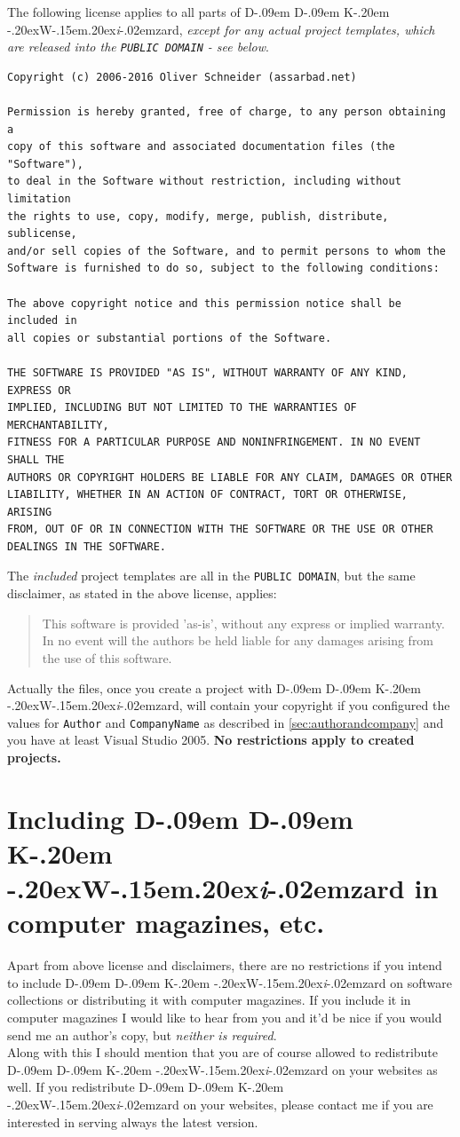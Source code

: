 \documentclass[a4paper,titlepage]{report}
\def\ddkwiz{D\kern-.09em D\kern-.09em K\kern-.20em \raise-.20ex\hbox{W}\kern-.15em\raise.20ex\hbox{\it{i}}\kern-.02em{zard}}
\begin{document}
The following license applies to all parts of \ddkwiz{}, \emph{except for any actual project templates, which are released into the \texttt{PUBLIC DOMAIN} - see below}.

\begin{verbatim}
Copyright (c) 2006-2016 Oliver Schneider (assarbad.net)

Permission is hereby granted, free of charge, to any person obtaining a
copy of this software and associated documentation files (the "Software"),
to deal in the Software without restriction, including without limitation
the rights to use, copy, modify, merge, publish, distribute, sublicense,
and/or sell copies of the Software, and to permit persons to whom the
Software is furnished to do so, subject to the following conditions:

The above copyright notice and this permission notice shall be included in
all copies or substantial portions of the Software.

THE SOFTWARE IS PROVIDED "AS IS", WITHOUT WARRANTY OF ANY KIND, EXPRESS OR
IMPLIED, INCLUDING BUT NOT LIMITED TO THE WARRANTIES OF MERCHANTABILITY,
FITNESS FOR A PARTICULAR PURPOSE AND NONINFRINGEMENT. IN NO EVENT SHALL THE
AUTHORS OR COPYRIGHT HOLDERS BE LIABLE FOR ANY CLAIM, DAMAGES OR OTHER
LIABILITY, WHETHER IN AN ACTION OF CONTRACT, TORT OR OTHERWISE, ARISING
FROM, OUT OF OR IN CONNECTION WITH THE SOFTWARE OR THE USE OR OTHER
DEALINGS IN THE SOFTWARE.
\end{verbatim}

The \emph{included} project templates are all in the \texttt{PUBLIC DOMAIN}, but the same
disclaimer, as stated in the above license, applies:

\begin{quote}
This software is provided 'as-is', without any express or implied warranty. In
no event will the authors be held liable for any damages arising from the use
of this software.
\end{quote}

Actually the files, once you create a project with \ddkwiz{}, will contain your
copyright if you configured the values for \texttt{Author} and \texttt{CompanyName}
as described in \autoref{sec:authorandcompany} and you have at least Visual
Studio 2005. \textbf{No restrictions apply to created projects.}

\section*{Including \ddkwiz{} in computer magazines, etc.}
\addcontentsline{toc}{section}{\numberline{}Redistributing \ddkwiz{}}
Apart from above license and disclaimers, there are no restrictions if you intend
to include \ddkwiz{} on software collections or distributing it with computer
magazines. If you include it in computer magazines I would like to hear from
you and it'd be nice if you would send me an author's copy, but \emph{neither is required}.\\
Along with this I should mention that you are of course allowed to redistribute
\ddkwiz{} on your websites as well. If you redistribute \ddkwiz{} on your
websites, please contact me if you are interested in serving always the latest
version.
\end{document}
